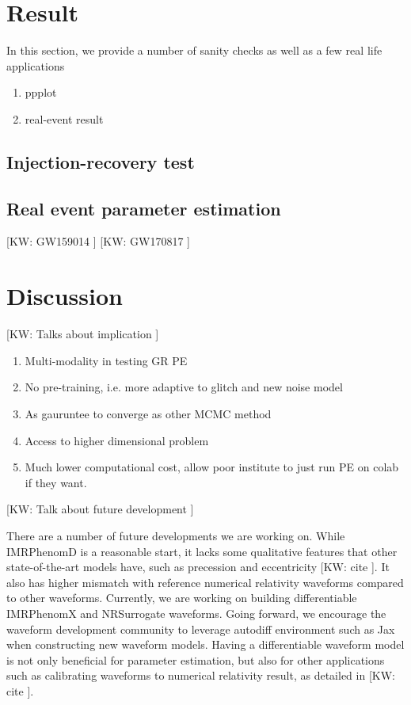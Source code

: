 \documentclass[twocolumn]{aastex631}
\newcommand{\kw}[1]{{\color{rb4}[KW: #1 ]}}
\begin{document}
\section{Result}
\label{sec: Result}

In this section, we provide a number of sanity checks as well as a few real life applications

\begin{enumerate}
    \item ppplot
    \item real-event result
\end{enumerate}

\subsection{Injection-recovery test}

\subsection{Real event parameter estimation}

\kw{GW159014}
\kw{GW170817}

\section{Discussion}
\label{sec: Discussion}

\kw{Talks about implication}
\begin{enumerate}
    \item Multi-modality in testing GR PE
    \item No pre-training, i.e. more adaptive to glitch and new noise model
    \item As gauruntee to converge as other MCMC method
    \item Access to higher dimensional problem
    \item Much lower computational cost, allow poor institute to just run PE on colab if they want.
\end{enumerate}

\kw{Talk about future development}


There are a number of future developments we are working on. While IMRPhenomD is
a reasonable start, it lacks some qualitative features that other
state-of-the-art models have, such as precession and eccentricity \kw{cite}. It
also has higher mismatch with reference numerical relativity waveforms compared
to other waveforms. Currently, we are working on building differentiable
IMRPhenomX and NRSurrogate waveforms. Going forward, we encourage the waveform
development community to leverage autodiff environment such as Jax when
constructing new waveform models. Having a differentiable waveform model is not
only beneficial for parameter estimation, but also for other applications such
as calibrating waveforms to numerical relativity result, as detailed in
\kw{cite}.
\end{document}

